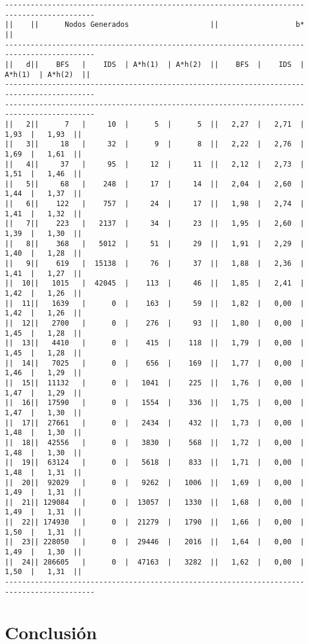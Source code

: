 \documentclass[a4paper]{article}
\begin{document}
\begin{lstlisting}
-------------------------------------------------------------------------------------------
||    ||      Nodos Generados                   ||                  b*                   ||
-------------------------------------------------------------------------------------------
||   d||    BFS   |    IDS  | A*h(1)  | A*h(2)  ||    BFS  |    IDS  | A*h(1)  | A*h(2)  ||
-------------------------------------------------------------------------------------------
-------------------------------------------------------------------------------------------
||   2||      7   |     10  |      5  |      5  ||   2,27  |   2,71  |   1,93  |   1,93  ||
||   3||     18   |     32  |      9  |      8  ||   2,22  |   2,76  |   1,69  |   1,61  ||
||   4||     37   |     95  |     12  |     11  ||   2,12  |   2,73  |   1,51  |   1,46  ||
||   5||     68   |    248  |     17  |     14  ||   2,04  |   2,60  |   1,44  |   1,37  ||
||   6||    122   |    757  |     24  |     17  ||   1,98  |   2,74  |   1,41  |   1,32  ||
||   7||    223   |   2137  |     34  |     23  ||   1,95  |   2,60  |   1,39  |   1,30  ||
||   8||    368   |   5012  |     51  |     29  ||   1,91  |   2,29  |   1,40  |   1,28  ||
||   9||    619   |  15138  |     76  |     37  ||   1,88  |   2,36  |   1,41  |   1,27  ||
||  10||   1015   |  42045  |    113  |     46  ||   1,85  |   2,41  |   1,42  |   1,26  ||
||  11||   1639   |      0  |    163  |     59  ||   1,82  |   0,00  |   1,42  |   1,26  ||
||  12||   2700   |      0  |    276  |     93  ||   1,80  |   0,00  |   1,45  |   1,28  ||
||  13||   4410   |      0  |    415  |    118  ||   1,79  |   0,00  |   1,45  |   1,28  ||
||  14||   7025   |      0  |    656  |    169  ||   1,77  |   0,00  |   1,46  |   1,29  ||
||  15||  11132   |      0  |   1041  |    225  ||   1,76  |   0,00  |   1,47  |   1,29  ||
||  16||  17590   |      0  |   1554  |    336  ||   1,75  |   0,00  |   1,47  |   1,30  ||
||  17||  27661   |      0  |   2434  |    432  ||   1,73  |   0,00  |   1,48  |   1,30  ||
||  18||  42556   |      0  |   3830  |    568  ||   1,72  |   0,00  |   1,48  |   1,30  ||
||  19||  63124   |      0  |   5618  |    833  ||   1,71  |   0,00  |   1,48  |   1,31  ||
||  20||  92029   |      0  |   9262  |   1006  ||   1,69  |   0,00  |   1,49  |   1,31  ||
||  21|| 129084   |      0  |  13057  |   1330  ||   1,68  |   0,00  |   1,49  |   1,31  ||
||  22|| 174930   |      0  |  21279  |   1790  ||   1,66  |   0,00  |   1,50  |   1,31  ||
||  23|| 228050   |      0  |  29446  |   2016  ||   1,64  |   0,00  |   1,49  |   1,30  ||
||  24|| 286605   |      0  |  47163  |   3282  ||   1,62  |   0,00  |   1,50  |   1,31  ||
-------------------------------------------------------------------------------------------
\end{lstlisting}



\section{Conclusión}
\end{document}
